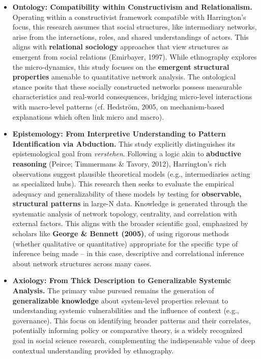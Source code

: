 \begin{itemize}[leftmargin=*]
    \item \textbf{Ontology: Compatibility within Constructivism and Relationalism.} Operating within a constructivist framework compatible with Harrington's focus, this research assumes that social structures, like intermediary networks, arise from the interactions, roles, and shared understandings of actors. This aligns with \textbf{relational sociology} approaches that view structures as emergent from social relations (Emirbayer, 1997). While ethnography explores the micro-dynamics, this study focuses on the \textbf{emergent structural properties} amenable to quantitative network analysis. The ontological stance posits that these socially constructed networks possess measurable characteristics and real-world consequences, bridging micro-level interactions with macro-level patterns (cf. Hedström, 2005, on mechanism-based explanations which often link micro and macro).

    \item \textbf{Epistemology: From Interpretive Understanding to Pattern Identification via Abduction.} This study explicitly distinguishes its epistemological goal from \textit{verstehen}. Following a logic akin to \textbf{abductive reasoning} (Peirce; Timmermans \& Tavory, 2012), Harrington's rich observations suggest plausible theoretical models (e.g., intermediaries acting as specialized hubs). This research then seeks to evaluate the empirical adequacy and generalizability of these models by testing for \textbf{observable, structural patterns} in large-N data. Knowledge is generated through the systematic analysis of network topology, centrality, and correlation with external factors. This aligns with the broader scientific goal, emphasized by scholars like \textbf{George \& Bennett (2005)}, of using rigorous methods (whether qualitative or quantitative) appropriate for the specific type of inference being made – in this case, descriptive and correlational inference about network structures across many cases.

    \item \textbf{Axiology: From Thick Description to Generalizable Systemic Analysis.} The primary value pursued remains the generation of \textbf{generalizable knowledge} about system-level properties relevant to understanding systemic vulnerabilities and the influence of context (e.g., governance). This focus on identifying broader patterns and their correlates, potentially informing policy or comparative theory, is a widely recognized goal in social science research, complementing the indispensable value of deep contextual understanding provided by ethnography.
\end{itemize}

